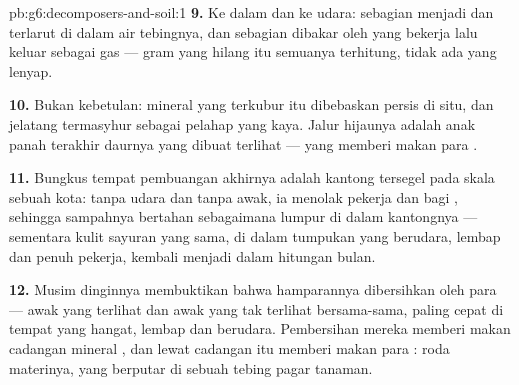 \begin{solution}{pb:g6:decomposers-and-soil:1}
\textbf{9.} Ke dalam  dan ke udara: sebagian menjadi  dan
 terlarut di dalam air  tebingnya, dan sebagian
dibakar oleh  yang bekerja lalu keluar sebagai gas --- gram
yang hilang itu semuanya terhitung, tidak ada yang lenyap.

\textbf{10.} Bukan kebetulan: mineral  yang terkubur itu
dibebaskan persis di situ, dan jelatang termasyhur sebagai pelahap
 yang kaya. Jalur hijaunya adalah anak panah terakhir daurnya
yang dibuat terlihat ---  yang memberi makan para .

\textbf{11.} Bungkus tempat pembuangan akhirnya adalah kantong
tersegel pada skala sebuah kota: tanpa udara dan tanpa awak, ia
menolak pekerja dan  bagi , sehingga sampahnya
bertahan sebagaimana lumpur di dalam kantongnya --- sementara kulit
sayuran yang sama, di dalam tumpukan yang berudara, lembap dan penuh
pekerja, kembali menjadi  dalam hitungan bulan.

\textbf{12.} Musim dinginnya membuktikan bahwa hamparannya dibersihkan
oleh para   --- awak yang terlihat dan awak yang tak
terlihat bersama-sama, paling cepat di tempat yang hangat, lembap dan
berudara. Pembersihan mereka memberi makan cadangan mineral ,
dan lewat cadangan itu memberi makan para : roda materinya,
yang berputar di sebuah tebing pagar tanaman.
\end{solution}
